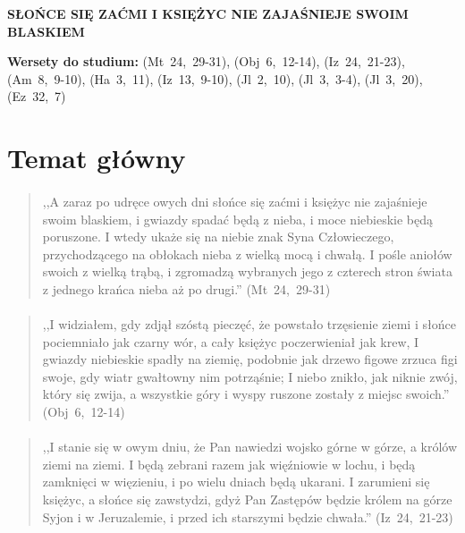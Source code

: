 \documentclass[10pt,a4paper,oneside]{article}
\begin{document}
\centerline{\textbf{\MakeUppercase{Słońce się zaćmi i księżyc nie zajaśnieje swoim blaskiem}}}
\begin{center}
\textbf{Wersety do studium:} 
\mbox{(Mt 24, 29-31)}, \mbox{(Obj 6, 12-14)}, \mbox{(Iz 24, 21-23)}, \mbox{(Am 8, 9-10)}, \mbox{(Ha 3, 11)}, \mbox{(Iz 13, 9-10)}, \mbox{(Jl 2, 10)}, \mbox{(Jl 3, 3-4)}, \mbox{(Jl 3, 20)}, \mbox{(Ez 32, 7)}
\end{center}
\section{Temat główny}
\paragraph{}
\begin{quote}
,,A zaraz po udręce owych dni słońce się zaćmi i księżyc nie zajaśnieje swoim blaskiem, i gwiazdy spadać będą z nieba, i moce niebieskie będą poruszone. I wtedy ukaże się na niebie znak Syna Człowieczego, przychodzącego na obłokach nieba z wielką mocą i chwałą. I pośle aniołów swoich z wielką trąbą, i zgromadzą wybranych jego z czterech stron świata z jednego krańca nieba aż po drugi.'' \mbox{(Mt 24, 29-31)}
\end{quote}
\paragraph{}
\begin{quote}
,,I widziałem, gdy zdjął szóstą pieczęć, że powstało trzęsienie ziemi i słońce pociemniało jak czarny wór, a cały księżyc poczerwieniał jak krew, I gwiazdy niebieskie spadły na ziemię, podobnie jak drzewo figowe zrzuca figi swoje, gdy wiatr gwałtowny nim potrząśnie; I niebo znikło, jak niknie zwój, który się zwija, a wszystkie góry i wyspy ruszone zostały z miejsc swoich.'' \mbox{(Obj 6, 12-14)}
\end{quote}
\paragraph{}
\begin{quote}
,,I stanie się w owym dniu, że Pan nawiedzi wojsko górne w górze, a królów ziemi na ziemi. I będą zebrani razem jak więźniowie w lochu, i będą zamknięci w więzieniu, i po wielu dniach będą ukarani. I zarumieni się księżyc, a słońce się zawstydzi, gdyż Pan Zastępów będzie królem na górze Syjon i w Jeruzalemie, i przed ich starszymi będzie chwała.'' \mbox{(Iz 24, 21-23)}
\end{quote}
\end{document}
